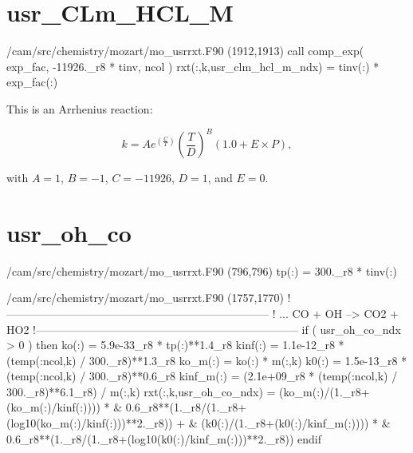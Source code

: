 \documentclass[titlepage]{article}
\begin{document}
\section{usr\_CLm\_HCL\_M}

\begin{blockcode}[commandchars=\\\{\}]
\color{gray}/cam/src/chemistry/mozart/mo_usrrxt.F90 (1912,1913)
        call comp_exp( exp_fac, -11926._r8 * tinv, ncol )
        rxt(:,k,usr_clm_hcl_m_ndx) =  tinv(:) * exp_fac(:)
\end{blockcode} 

This is an Arrhenius reaction:

\begin{equation}
k = Ae^{(\frac{C}{T})}(\frac{T}{D})^B(1.0+E \times P),
\end{equation}

\noindent with $A = 1$, $B = -1$, $C = -11926$, $D = 1$, and $E = 0$.


\section{usr\_oh\_co}

\begin{blockcode}[commandchars=\\\{\}]
\color{gray}/cam/src/chemistry/mozart/mo_usrrxt.F90 (796,796)
       tp(:)             = 300._r8 * tinv(:)
\end{blockcode}
\begin{blockcode}[commandchars=\\\{\}]
\color{gray}/cam/src/chemistry/mozart/mo_usrrxt.F90 (1757,1770)
       !-----------------------------------------------------------------------
       !     ... CO + OH --> CO2 + HO2
       !-----------------------------------------------------------------------
       if ( usr_oh_co_ndx > 0 ) then
          ko(:)     = 5.9e-33_r8 * tp(:)**1.4_r8
          kinf(:)   = 1.1e-12_r8 * (temp(:ncol,k) / 300._r8)**1.3_r8
          ko_m(:)   = ko(:) * m(:,k)
          k0(:)     = 1.5e-13_r8 * (temp(:ncol,k) / 300._r8)**0.6_r8
          kinf_m(:) = (2.1e+09_r8 * (temp(:ncol,k) / 300._r8)**6.1_r8) / m(:,k)
          rxt(:,k,usr_oh_co_ndx) = (ko_m(:)/(1._r8+(ko_m(:)/kinf(:)))) * &
               0.6_r8**(1._r8/(1._r8+(log10(ko_m(:)/kinf(:)))**2._r8)) + &
               (k0(:)/(1._r8+(k0(:)/kinf_m(:)))) * &
               0.6_r8**(1._r8/(1._r8+(log10(k0(:)/kinf_m(:)))**2._r8))
       endif
\end{blockcode}
\end{document}

